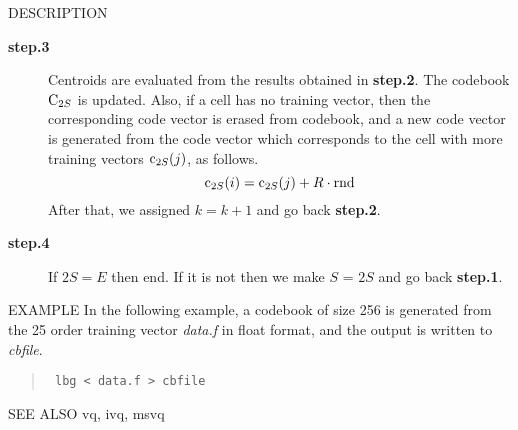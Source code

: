 \begin{qsection}{DESCRIPTION}
\begin{description}
\item[\bf step.3~~~]
Centroids are evaluated from the results obtained in {\bf step.2}.
The codebook $\mbox{\boldmath C}_{2S}$ is updated.
Also, if a cell has no training vector, then the corresponding
code vector is erased from codebook,
and a new code vector is generated from the code vector
which corresponds to the cell with more training vectors 
$\mbox{\boldmath c}_{2S}(j)$, as follows.
\begin{displaymath}
\mbox{\boldmath c}_{2S}(i)=\mbox{\boldmath c}_{2S}(j) + R \cdot \mbox{\boldmath rnd}
\end{displaymath}
After that, we assigned $k=k+1$ and go back {\bf step.2}.

\item[\bf step.4~~~]
If $2S = E$ then end.
If it is not then we make $S$ = $2S$ and go back {\bf step.1}.

\end{description}
\end{qsection}

\begin{options}
\end{options}

\begin{qsection}{EXAMPLE}
In the following example, a codebook of size 256 is generated from
the 25 order training vector {\em data.f} in float format,
and the output is written to {\em cbfile}.
\begin{quote}
\verb! lbg < data.f > cbfile!
\end{quote}
\end{qsection}

\begin{qsection}{SEE ALSO}
vq, ivq, msvq
\end{qsection}
